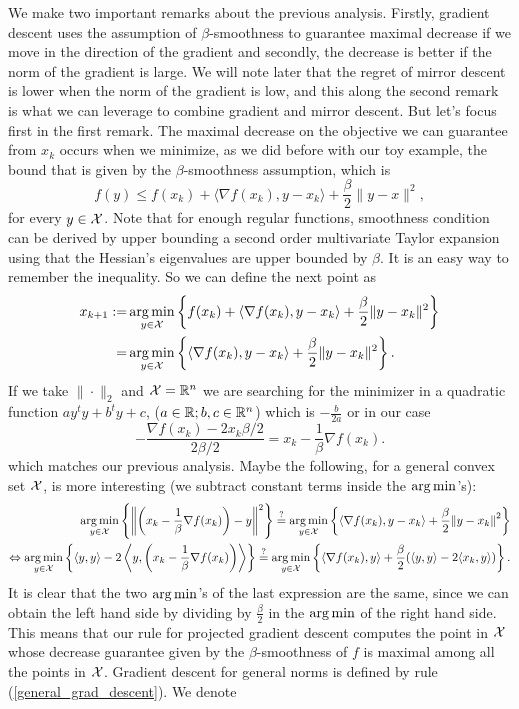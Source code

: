 We make two important remarks about the previous analysis. Firstly, gradient descent uses the assumption of $\beta$-smoothness to guarantee maximal decrease if we move in the direction of the gradient and secondly, the decrease is better if the norm of the gradient is large. We will note later that the regret of mirror descent is lower when the norm of the gradient is low, and this along the second remark is what we can leverage to combine gradient and mirror descent. But let's focus first in the first remark. The maximal decrease on the objective we can guarantee from $x_k$ occurs when we minimize, as we did before with our toy example, the bound that is given by the $\beta$-smoothness assumption, which is
\[
    f(y) \leq f(x_k) + \langle \nabla f(x_k), y-x_k \rangle + \frac{\beta}{2} \|{y-x}\|^2,
\]
for every $y \in \mathcal{X}$. Note that for enough regular functions, smoothness condition can be derived by upper bounding a second order multivariate Taylor expansion using that the Hessian's eigenvalues are upper bounded by $\beta$. It is an easy way to remember the inequality. So we can define the next point as
 \begin{align}\label{general_grad_descent}
     \begin{aligned}
     x_{k+1} := &\operatorname*{arg\,min}_{y \in \mathcal{X}} \left\{ f(x_k) + \langle \nabla f(x_k), y-x_k \rangle  +\frac{\beta}{2}\|{y-x_k}\|^2\right\} \\
    = &\operatorname*{arg\,min}_{y \in \mathcal{X}} \left\{ \langle \nabla f(x_k), y-x_k \rangle  +\frac{\beta}{2}\|{y-x_k}\|^2\right\}.
    \end{aligned}
\end{align}
If we take $\|{\cdot}\|_2$ and $\mathcal{X} = \mathbb{R}^n$ we are searching for the minimizer in a quadratic function $a y^t y + b^t y + c $, ($a \in \mathbb{R}; b, c \in \mathbb{R}^n$) which is $-\frac{b}{2a}$ or in our case
\[
    -\frac{\nabla f(x_k) - 2 x_k \beta/2}{2 \beta/2} = x_k - \frac{1}{\beta}\nabla f(x_k).
\]
which matches our previous analysis. Maybe the following, for a general convex set $\mathcal{X}$, is more interesting (we subtract constant terms inside the $\operatorname*{arg\,min}$'s):
\begin{align*}
    \operatorname*{arg\,min}_{y \in \mathcal{X}} \left\{ \left\|{\left(x_k - \frac{1}{\beta}\nabla f(x_k)\right) - y}\right\|^2 \right\} \stackrel{?}{=} \operatorname*{arg\,min}_{y \in \mathcal{X}} \left\{ \langle \nabla f(x_k), y-x_k \rangle  +\frac{\beta}{2}\|{y-x_k\|}^2\right\} \\
    \Leftrightarrow \operatorname*{arg\,min}_{y \in \mathcal{X}} \left\{ \langle y, y\rangle - 2\left\langle y, \left(x_k - \frac{1}{\beta} \nabla f(x_k)\right)\right\rangle\right\} \stackrel{?}{=} \operatorname*{arg\,min}_{y \in \mathcal{X}} \left\{ \langle \nabla f(x_k), y\rangle + \frac{\beta}{2}(\langle y, y\rangle - 2\langle x_k, y\rangle)\right\}. \\
\end{align*}
It is clear that the two $\operatorname*{arg\,min}$'s of the last expression are the same, since we can obtain the left hand side by dividing by $\frac{\beta}{2}$ in the $\operatorname*{arg\,min}$ of the right hand side. This means that our rule for projected gradient descent computes the point in $\mathcal{X}$ whose decrease guarantee given by the $\beta$-smoothness of $f$ is maximal among all the points in $\mathcal{X}$. Gradient descent for general norms is defined by rule (\ref{general_grad_descent}). We denote 

